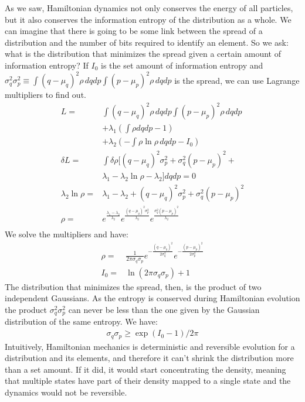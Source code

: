 \documentclass[11pt]{article}
\begin{document}
As we saw, Hamiltonian dynamics not only conserves the energy of all particles, but it also conserves the information entropy of the distribution as a whole. We can imagine that there is going to be some link between the spread of a distribution and the number of bits required to identify an element. So we ask: what is the distribution that minimizes the spread given a certain amount of information entropy? If $I_0$ is the set amount of information entropy and $\sigma_q^2 \sigma_p^2 \equiv \int (q-\mu_q)^2 \rho \, dqdp \int (p-\mu_p)^2 \rho \, dqdp$ is the spread, we can use Lagrange multipliers to find out.
\begin{align*}
L = &\int (q-\mu_q)^2 \rho \, dqdp \int (p-\mu_p)^2 \rho \, dqdp \\
&+ \lambda_1(\int \rho dqdp - 1) \\ &+ \lambda_2(- \int \rho \ln \rho \, dqdp - I_0)\\ 
\delta L = &\int \delta \rho [(q-\mu_q)^2 \sigma_p^2 + \sigma_q^2 (p-\mu_p)^2 + \\ &\lambda_1 - \lambda_2 \ln \rho - \lambda_2 ] dqdp = 0 \\
\lambda_2 \ln \rho = &\lambda_1 - \lambda_2 + (q-\mu_q)^2 \sigma_p^2 + \sigma_q^2 (p-\mu_p)^2 \\
\rho = &e^{\frac{\lambda_1 - \lambda_2}{\lambda_2}}e^{\frac{(q-\mu_q)^2 \sigma_p^2}{\lambda_2}}e^{\frac{\sigma_q^2 (p-\mu_p)^2}{\lambda_2}}\\
\end{align*}
We solve the multipliers and have:
\begin{align*}
\rho = &\frac{1}{ 2 \pi \sigma_q \sigma_p} e^{-\frac{(q-\mu_q)^2}{2\sigma_q^2}} e^{-\frac{(p-\mu_p)^2}{2\sigma_p^2}} \\
I_0 = &\ln (2\pi\sigma_q\sigma_p) + 1
\end{align*}
The distribution that minimizes the spread, then, is the product of two independent Gaussians. As the entropy is conserved during Hamiltonian evolution the product $\sigma_q^2 \sigma_p^2$ can never be less than the one given by the Gaussian distribution of the same entropy. We have:
\begin{align*}
\sigma_q\sigma_p \geq \exp (I_0 - 1) / 2 \pi 
\end{align*}
Intuitively, Hamiltonian mechanics is deterministic and reversible evolution for a distribution and its elements, and therefore it can't shrink the distribution more than a set amount. If it did, it would start concentrating the density, meaning that multiple states have part of their density mapped to a single state and the dynamics would not be reversible.
\end{document}
